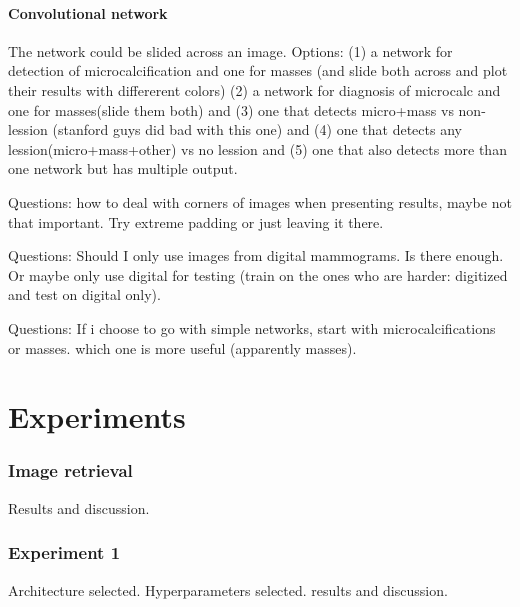 \documentclass[11pt]{article}
\begin{document}
	\subsection{Convolutional network}
	The network could be slided across an image. Options: (1) a network for detection of microcalcification and one for masses (and slide both across and plot their results with differerent colors) (2) a network for diagnosis of microcalc and one for masses(slide them both) and (3) one that detects micro+mass vs non-lession (stanford guys did bad with this one) and (4) one that detects any lession(micro+mass+other) vs no lession and (5) one that also detects more than one network but has multiple output.
	
	Questions: how to deal with corners of images when presenting results, maybe not that important. Try extreme padding or just leaving it there.

	Questions: Should I only use images from digital mammograms. Is there enough. Or maybe only use digital for testing (train on the ones who are harder: digitized and test on digital only).

	Questions: If i choose to go with simple networks, start with microcalcifications or masses. which one is more useful (apparently masses).



	\part{Experiments}
	\section{Image retrieval}
	Results and discussion.
	\section{Experiment 1}
	Architecture selected. Hyperparameters selected. results and discussion.

	
	
	
\end{document}
